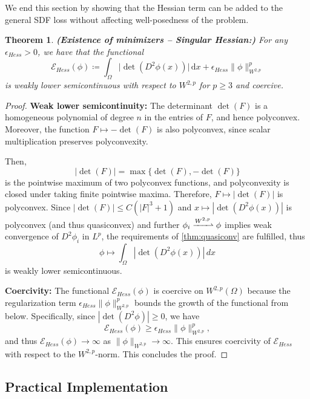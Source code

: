 \documentclass[12pt,openany]{book}
\theoremstyle{plainnormal}
\newtheorem{theorem}{Theorem}[section]
\theoremstyle{remark}
\begin{document}
We end this section by showing that the Hessian term can be added to the general SDF loss without affecting well-posedness of the problem.
\begin{theorem}{\textbf{(Existence of minimizers -- Singular Hessian:)}}
For any $\epsilon_{Hess} > 0$, we have that the functional $$ \mathcal E_{Hess}(\phi) \coloneqq \int_\Omega \big|\det(D^2 \phi(x))\big| \,\mathrm{d}x + \epsilon_{Hess} \|\phi\|_{W^{2,p}}^p $$
is weakly lower semicontinuous with respect to $W^{2,p}$ for $p\geq 3$ and coercive.
\end{theorem} 
\begin{proof}
    \textbf{Weak lower semicontinuity:} 
The determinant \(\det(F)\) is a homogeneous polynomial of degree \(n\) in the entries of \(F\), and hence polyconvex. Moreover, the function \(F \mapsto -\det(F)\) is also polyconvex, since scalar multiplication preserves polyconvexity.

Then,
\[
|\det(F)| = \max\{ \det(F), -\det(F) \}
\]
is the pointwise maximum of two polyconvex functions, and polyconvexity is closed under taking finite pointwise maxima. Therefore, \(F \mapsto |\det(F)|\) is polyconvex. Since \(|\det(F)| \leq C (|F|^3+1)\) and \mbox{\(x \mapsto |\det(D^2 \phi(x))|\)} is polyconvex (and thus quasiconvex) and further \(\phi_i \xrightharpoonup{W^{2,p}} \phi\) implies weak convergence of \(D^2 \phi_i\) in \(L^p\), the requirements of \cref{thm:quasiconv} are fulfilled, thus
\[
\phi \mapsto \int_\Omega |\det(D^2 \phi(x))|\, dx
\]
is weakly lower semicontinuous.\par
    \textbf{Coercivity:}  
    The functional \(\mathcal{E}_{Hess}(\phi)\) is coercive on \(W^{2,p}(\Omega)\) because the regularization term \(\epsilon_{Hess} \|\phi\|_{W^{2,p}}^p\) bounds the growth of the functional from below. Specifically, since \(|\det(D^2\phi)| \geq 0\), we have
    \[
    \mathcal{E}_{Hess}(\phi) \geq \epsilon_{Hess} \|\phi\|_{W^{2,p}}^p,
    \]
    and thus \(\mathcal{E}_{Hess}(\phi) \to \infty\) as \(\|\phi\|_{W^{2,p}} \to \infty\). This ensures coercivity of \(\mathcal{E}_{Hess}\) with respect to the \(W^{2,p}\)-norm. This concludes the proof.
\end{proof}
\subsection{Practical Implementation}\label{practicalImplememntation}
\end{document}
